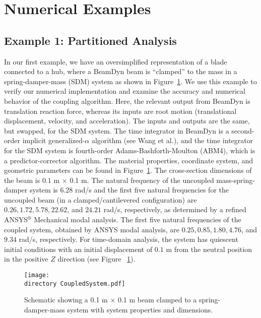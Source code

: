 \documentclass{aiaa-tc}
\def\directory{EPSF/}
\begin{document}
 
\section{Numerical Examples}
 
\subsection{Example 1: Partitioned Analysis}

In our first example, we have an oversimplified representation of a blade connected to a hub, where
a BeamDyn beam is ``clamped'' to the mass in a spring-damper-mass (SDM) system as shown in Figure~\ref{fig:CoupledSystem}.     
We use this example to verify our numerical implementation and examine the accuracy and numerical behavior of the coupling algorithm. 
Here, the relevant output from BeamDyn is translation reaction force, whereas its inputs are root motion (translational displacement, velocity, and acceleration).  
The inputs and outputs are the same, but swapped, for the SDM system.
The time integrator in BeamDyn is a second-order implicit generalized-$\alpha$ algorithm (see Wang et al.\cite{Wang:2014}), and the time integrator for the SDM system is fourth-order Adams-Bashforth-Moulton (ABM4), which is a predictor-corrector algorithm.
The material properties, coordinate system, and geometric parameters can be found in Figure~\ref{fig:CoupledSystem}. 
The cross-section dimensions of the beam is $0.1$ m $\times$ 0.1 m. 
The natural frequency of the uncoupled mass-spring-damper system is $6.28$ rad/s and the first five natural frequencies for the uncoupled beam (in a clamped/cantilevered configuration) are $0.26, 1.72, 5.78, 22.62$, and $24.21$ rad/s, respectively, as determined by a refined ANSYS$^{\circledR}$ Mechanical modal analysis. 
The first five natural frequencies of the coupled system, obtained by ANSYS modal analysis, are $0.25, 0.85, 1.80, 4.76$, and $9.34$ rad/s, respectively.
For time-domain analysis, the system has quiescent initial conditions with an initial displacement of $0.1$ m from the neutral position in the positive $Z$ direction (see Figure ~\ref{fig:CoupledSystem}). 

\begin{figure}
\centering
\texttt{[image: \\directory CoupledSystem.pdf]}
\caption{Schematic showing a 0.1 m $\times$ 0.1 m beam clamped to a spring-damper-mass system with system properties and dimensions.} 
\label{fig:CoupledSystem}
\end{figure}
 
\end{document}
